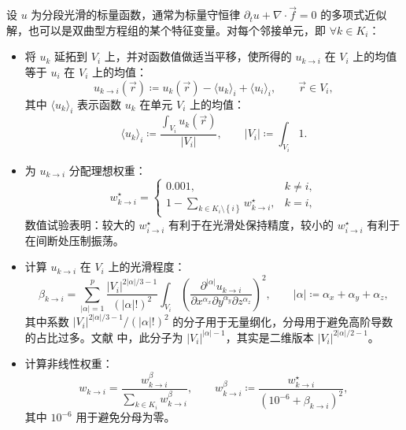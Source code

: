 设 $u$ 为分段光滑的标量函数，通常为标量守恒律 $\partial_{t}u+\nabla\cdot\vec{f}=0$ 的多项式近似解，也可以是双曲型方程组的某个特征变量。对每个邻接单元，即
$\forall k\in K_{i}$：
\begin{itemize}
\item 将 $u_{k}$ 延拓到 $V_{i}$ 上，并对函数值做适当平移，使所得的
$u_{k\to i}$ 在 $V_{i}$ 上的均值等于 $u_{i}$ 在 $V_{i}$ 上的均值：
\begin{equation}
u_{k\to i}(\vec{r})\coloneqq u_{k}(\vec{r})-\langle u_{k}\rangle_{i}+\langle u_{i}\rangle_{i},\qquad\vec{r}\in V_{i},
\end{equation}
其中 $\langle u_{k}\rangle_{i}$ 表示函数 $u_{k}$ 在单元 $V_{i}$ 上的均值：
\begin{equation}
\langle u_{k}\rangle_{i}\coloneqq\frac{\int_{V_{i}}u_{k}(\vec{r})}{\vert V_{i}\vert},\qquad\vert V_{i}\vert\coloneqq\int_{V_{i}}1.
\end{equation}
\item 为 $u_{k\to i}$ 分配理想权重：
\begin{equation}
w_{k\to i}^{\star}=\begin{cases}
0.001, & k\ne i,\\
1-\sum_{k\in K_{i}\setminus\left\{ i\right\} }w_{k\to i}^{\star}, & k=i,
\end{cases}
\end{equation}
数值试验表明：较大的 $w_{i\to i}^{\star}$ 有利于在光滑处保持精度，较小的 $w_{i\to i}^{\star}$
有利于在间断处压制振荡。
\item 计算 $u_{k\to i}$ 在 $V_{i}$ 上的光滑程度：
\begin{equation}
\beta_{k\to i}=\sum_{\vert\alpha\vert=1}^{p}\frac{\vert V_{i}\vert^{2\vert\alpha\vert/3-1}}{(\vert\alpha\vert!)^{2}}\int_{V_{i}}\left(\frac{\partial^{\vert\alpha\vert}u_{k\to i}}{\partial x^{\alpha_{x}}\partial y^{\alpha_{y}}\partial z^{\alpha_{z}}}\right)^{2},\qquad\vert\alpha\vert\coloneqq\alpha_{x}+\alpha_{y}+\alpha_{z},
\end{equation}
其中系数 $\vert V_{i}\vert^{2\vert\alpha\vert/3-1}/(\vert\alpha\vert!)^{2}$
的分子用于无量纲化，分母用于避免高阶导数的占比过多。文献 \cite{Zhu_2013} 中，此分子为 $\vert V_{i}\vert^{\vert\alpha\vert-1}$，其实是二维版本
$\vert V_{i}\vert^{2\vert\alpha\vert/2-1}$。
\item 计算非线性权重：
\begin{equation}
w_{k\to i}=\frac{w_{k\to i}^{\beta}}{\sum_{k\in K_{i}}w_{k\to i}^{\beta}},\qquad w_{k\to i}^{\beta}\coloneqq\frac{w_{k\to i}^{\star}}{\left(10^{-6}+\beta_{k\to i}\right)^{2}},
\end{equation}
其中 $10^{-6}$ 用于避免分母为零。
\end{itemize}

